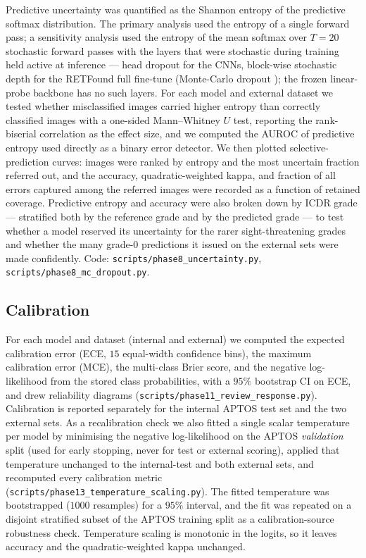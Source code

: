 \documentclass[journal]{IEEEtran}
\begin{document}
Predictive uncertainty was quantified as the Shannon entropy of the predictive
softmax distribution. The primary analysis used the entropy of a single forward
pass; a sensitivity analysis used the entropy of the mean softmax over $T=20$
stochastic forward passes with the layers that were stochastic during training
held active at inference --- head dropout for the CNNs, block-wise stochastic
depth for the RETFound full fine-tune (Monte-Carlo dropout
\cite{gal2016dropout}); the frozen linear-probe backbone has no such layers. For
each model and external dataset we tested whether misclassified images carried
higher entropy than correctly classified images with a one-sided Mann--Whitney
$U$ test, reporting the rank-biserial correlation as the effect size, and we
computed the AUROC of predictive entropy used directly as a binary error
detector. We then plotted selective-prediction curves: images were ranked by
entropy and the most uncertain fraction referred out, and the accuracy,
quadratic-weighted kappa, and fraction of all errors captured among the referred
images were recorded as a function of retained coverage. Predictive entropy and
accuracy were also broken down by ICDR grade --- stratified both by the reference
grade and by the predicted grade --- to test whether a model reserved its
uncertainty for the rarer sight-threatening grades and whether the many grade-0
predictions it issued on the external sets were made confidently. Code:
\texttt{scripts/phase8\_uncertainty.py}, \texttt{scripts/phase8\_mc\_dropout.py}.

\subsection{Calibration}
\label{sec:methods-calib}

For each model and dataset (internal and external) we computed the expected
calibration error (ECE, $15$ equal-width confidence bins), the maximum
calibration error (MCE), the multi-class Brier score, and the negative
log-likelihood from the stored class probabilities, with a $95\%$ bootstrap CI on
ECE, and drew reliability diagrams
(\texttt{scripts/phase11\_review\_response.py}). Calibration is reported
separately for the internal APTOS test set and the two external sets. As a
recalibration check we also fitted a single scalar temperature per model by
minimising the negative log-likelihood on the APTOS \emph{validation} split
(used for early stopping, never for test or external scoring), applied that
temperature unchanged to the internal-test and both external sets, and recomputed
every calibration metric (\texttt{scripts/phase13\_temperature\_scaling.py}). The
fitted temperature was bootstrapped ($1000$ resamples) for a $95\%$ interval, and
the fit was repeated on a disjoint stratified subset of the APTOS training split
as a calibration-source robustness check. Temperature scaling is monotonic in the
logits, so it leaves accuracy and the quadratic-weighted kappa unchanged.
\end{document}
